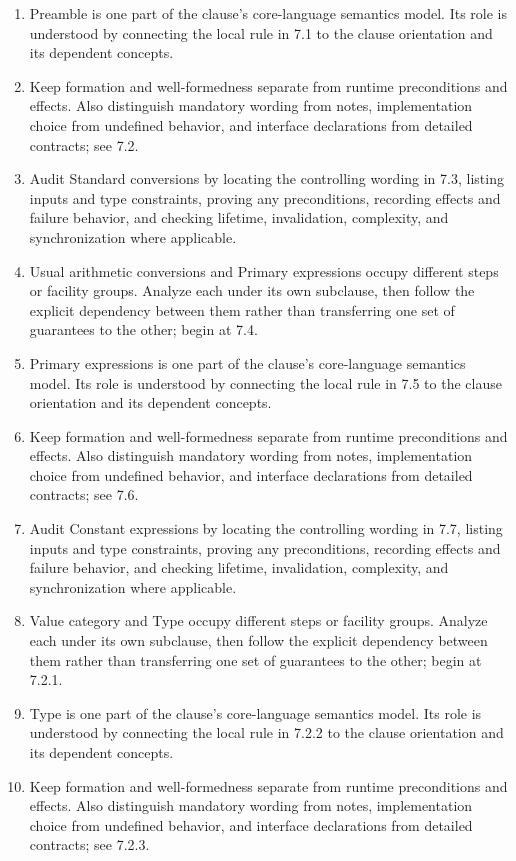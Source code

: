 \documentclass[11pt,letterpaper]{article}
\begin{document}
\begin{enumerate}
\item Preamble is one part of the clause's core-language semantics model. Its role is understood by connecting the local rule in 7.1 to the clause orientation and its dependent concepts.
\item Keep formation and well-formedness separate from runtime preconditions and effects. Also distinguish mandatory wording from notes, implementation choice from undefined behavior, and interface declarations from detailed contracts; see 7.2.
\item Audit Standard conversions by locating the controlling wording in 7.3, listing inputs and type constraints, proving any preconditions, recording effects and failure behavior, and checking lifetime, invalidation, complexity, and synchronization where applicable.
\item Usual arithmetic conversions and Primary expressions occupy different steps or facility groups. Analyze each under its own subclause, then follow the explicit dependency between them rather than transferring one set of guarantees to the other; begin at 7.4.
\item Primary expressions is one part of the clause's core-language semantics model. Its role is understood by connecting the local rule in 7.5 to the clause orientation and its dependent concepts.
\item Keep formation and well-formedness separate from runtime preconditions and effects. Also distinguish mandatory wording from notes, implementation choice from undefined behavior, and interface declarations from detailed contracts; see 7.6.
\item Audit Constant expressions by locating the controlling wording in 7.7, listing inputs and type constraints, proving any preconditions, recording effects and failure behavior, and checking lifetime, invalidation, complexity, and synchronization where applicable.
\item Value category and Type occupy different steps or facility groups. Analyze each under its own subclause, then follow the explicit dependency between them rather than transferring one set of guarantees to the other; begin at 7.2.1.
\item Type is one part of the clause's core-language semantics model. Its role is understood by connecting the local rule in 7.2.2 to the clause orientation and its dependent concepts.
\item Keep formation and well-formedness separate from runtime preconditions and effects. Also distinguish mandatory wording from notes, implementation choice from undefined behavior, and interface declarations from detailed contracts; see 7.2.3.

\end{enumerate}
\end{document}
